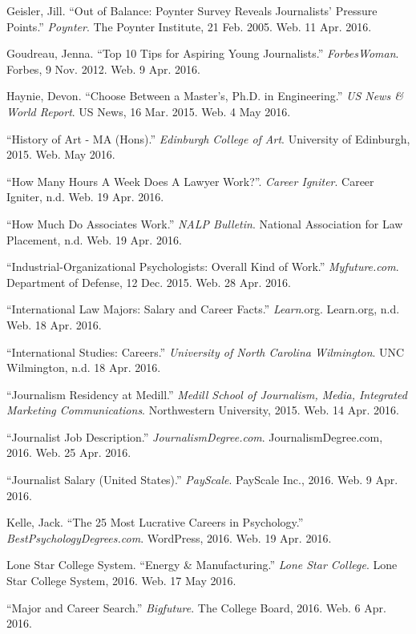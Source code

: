 \begin{workscited}
\begin{flushleft}
\bibent
Geisler, Jill. “Out of Balance: Poynter Survey Reveals Journalists’ Pressure Points.” \textit{Poynter}. The Poynter Institute, 21 Feb. 2005. Web. 11 Apr. 2016.

\bibent
Goudreau, Jenna. “Top 10 Tips for Aspiring Young Journalists.” \textit{ForbesWoman}. Forbes, 9 Nov. 2012. Web. 9 Apr. 2016.

\bibent
Haynie, Devon. “Choose Between a Master’s, Ph.D. in Engineering.” \textit{US News \& World Report}. US News, 16 Mar. 2015. Web. 4 May 2016. 

\bibent
“History of Art - MA (Hons).” \textit{Edinburgh College of Art}. University of Edinburgh, 2015. Web. May 2016.

\bibent
“How Many Hours A Week Does A Lawyer Work?”. \textit{Career Igniter}. Career Igniter, n.d. Web. 19 Apr. 2016. 

\bibent
“How Much Do Associates Work.” \textit{NALP Bulletin}. National Association for Law Placement, n.d. Web. 19 Apr. 2016. 

\bibent 
“Industrial-Organizational Psychologists: Overall Kind of Work.” \textit{Myfuture.com}. Department of Defense, 12 Dec. 2015. Web. 28 Apr. 2016. 

\bibent
“International Law Majors: Salary and Career Facts.” \textit{Learn}.org. Learn.org, n.d. Web. 18 Apr. 2016. 

\bibent
“International Studies: Careers.” \textit{University of North Carolina Wilmington}. UNC Wilmington, n.d. 18 Apr. 2016. 

\bibent
“Journalism Residency at Medill.” \textit{Medill School of Journalism, Media, Integrated Marketing Communications}. Northwestern University, 2015. Web. 14 Apr. 2016. 

\bibent
“Journalist Job Description.” \textit{JournalismDegree.com}. JournalismDegree.com, 2016. Web. 25 Apr. 2016.

\bibent
“Journalist Salary (United States).” \textit{PayScale}. PayScale Inc., 2016. Web. 9 Apr. 2016.

\bibent
Kelle, Jack. “The 25 Most Lucrative Careers in Psychology.” \textit{BestPsychologyDegrees.com}. WordPress, 2016. Web. 19 Apr. 2016. 

\bibent
Lone Star College System. “Energy \& Manufacturing.” \textit{Lone Star College}. Lone Star College System, 2016. Web. 17 May 2016.

\bibent
“Major and Career Search.” \textit{Bigfuture}. The College Board, 2016. Web. 6 Apr. 2016. 


\end{flushleft}
\end{workscited}
